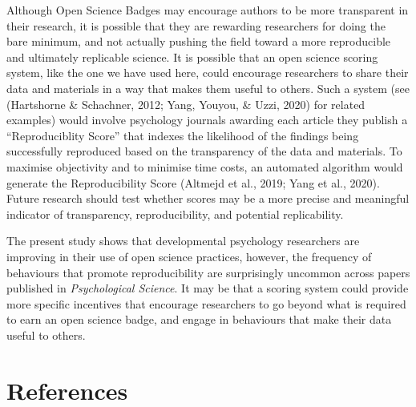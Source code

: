\documentclass[
  english,
  man,floatsintext]{apa6}
\begin{document}
Although Open Science Badges may encourage authors to be more transparent in their research, it is possible that they are rewarding researchers for doing the bare minimum, and not actually pushing the field toward a more reproducible and ultimately replicable science. It is possible that an open science scoring system, like the one we have used here, could encourage researchers to share their data and materials in a way that makes them useful to others. Such a system (see (Hartshorne \& Schachner, 2012; Yang, Youyou, \& Uzzi, 2020) for related examples) would involve psychology journals awarding each article they publish a ``Reproduciblity Score'' that indexes the likelihood of the findings being successfully reproduced based on the transparency of the data and materials. To maximise objectivity and to minimise time costs, an automated algorithm would generate the Reproducibility Score (Altmejd et al., 2019; Yang et al., 2020). Future research should test whether scores may be a more precise and meaningful indicator of transparency, reproducibility, and potential replicability.

The present study shows that developmental psychology researchers are improving in their use of open science practices, however, the frequency of behaviours that promote reproducibility are surprisingly uncommon across papers published in \emph{Psychological Science}. It may be that a scoring system could provide more specific incentives that encourage researchers to go beyond what is required to earn an open science badge, and engage in behaviours that make their data useful to others.

\newpage

\hypertarget{references}{%
\section{References}\label{references}}

\begingroup
\setlength{\parindent}{-0.5in}
\setlength{\leftskip}{0.5in}
\end{document}
